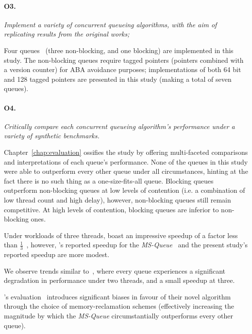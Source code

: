 \paragraph{O3.} \emph{Implement a variety of concurrent queueing algorithms, with the aim
of replicating results from the original works;}

Four queues~\citep{valois1994queues,hoffman2007baskets,michael1996simple} (three non-blocking, and one blocking) are implemented in this
study. The non-blocking queues require tagged pointers (pointers combined with a
version counter) for ABA avoidance purposes; implementations of both 64 bit and
128 tagged pointers are presented in this study (making a total of seven
queues).

\paragraph{O4.} \emph{Critically compare each concurrent queueing algorithm's performance
under a variety of synthetic benchmarks.}

Chapter~\ref{chap:evaluation} ossifies the study by offering multi-faceted
comparisons and interpretations of each queue's performance. None of the queues
in this study were able to outperform every other queue under all
circumstances, hinting at the fact there is no such thing as a
one-size-fits-all queue. Blocking queues outperform non-blocking queues at low
levels of contention (i.e. a combination of low thread count and high delay),
however, non-blocking queues still remain competitive. At high levels of
contention, blocking queues are inferior to non-blocking ones. 

Under workloads of three threads, \citeauthor{michael1996simple} boast an
impressive speedup of a factor less than $\frac{1}{3}$~\citep{michael1996simple},
however, \citeauthor{hoffman2007baskets}'s reported speedup for the
\emph{MS-Queue}~\citep{hoffman2007baskets} and the present study's reported
speedup are more modest.

We observe trends similar
to~\citep{ladan2008optimistic,hoffman2007baskets,michael1996simple}, where
every queue experiences a significant degradation in performance under two
threads, and a small speedup at three.

\citeauthor{michael1996simple}'s evaluation~\citep{michael1996simple}
introduces significant biases in favour of their novel algorithm through the
choice of memory-reclamation schemes (effectively increasing the magnitude by
which the \emph{MS-Queue} circumstantially outperforms every other queue).

